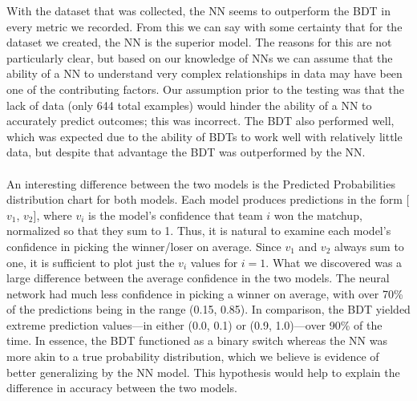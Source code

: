\documentclass[letterpaper]{article} %
\begin{document}
With the dataset that was collected, the NN seems to outperform the BDT in every metric we recorded. From this we can say with some certainty that for the dataset we created, the NN is the superior model. The reasons for this are not particularly clear, but based on our knowledge of NNs we can assume that the ability of a NN to understand very complex relationships in data may have been one of the contributing factors. Our assumption prior to the testing was that the lack of data (only 644 total examples) would hinder the ability of a NN to accurately predict outcomes; this was incorrect. The BDT also performed well, which was expected due to the ability of BDTs to work well with relatively little data, but despite that advantage the BDT was outperformed by the NN. \\ \\
An interesting difference between the two models is the Predicted Probabilities distribution chart for both models. Each model produces predictions in the form [$v_1$, $v_2$], where $v_i$ is the model's confidence that team $i$ won the matchup, normalized so that they sum to 1. Thus, it is natural to examine each model's confidence in picking the winner/loser on average. Since $v_1$ and $v_2$ always sum to one, it is sufficient to plot just the $v_i$ values for $i = 1$. What we discovered was a large difference between the average confidence in the two models. The neural network had much less confidence in picking a winner on average, with over 70\% of the predictions being in the range (0.15, 0.85). In comparison, the BDT yielded extreme prediction values---in either (0.0, 0.1) or (0.9, 1.0)---over 90\% of the time. In essence, the BDT functioned as a binary switch whereas the NN was more akin to a true probability distribution, which we believe is evidence of better generalizing by the NN model. This hypothesis would help to explain the difference in accuracy between the two models. \\ \\
\end{document}
